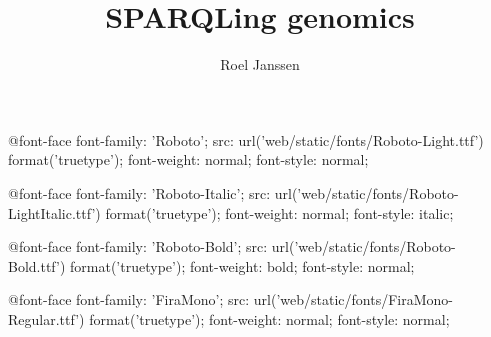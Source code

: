 \documentclass[11pt,a4paper,oneside]{book}
\title{SPARQLing genomics}
\author{Roel Janssen}
\begin{document}
\ifdefined\HCode
{} {\NoFonts\hfill\break} {\EndNoFonts}
\CssFile
@font-face {
    font-family: 'Roboto';
    src: url('web/static/fonts/Roboto-Light.ttf') format('truetype');
    font-weight: normal;
    font-style: normal;
}

@font-face {
    font-family: 'Roboto-Italic';
    src: url('web/static/fonts/Roboto-LightItalic.ttf') format('truetype');
    font-weight: normal;
    font-style: italic;
}

@font-face {
    font-family: 'Roboto-Bold';
    src: url('web/static/fonts/Roboto-Bold.ttf') format('truetype');
    font-weight: bold;
    font-style: normal;
}

@font-face {
    font-family: 'FiraMono';
    src: url('web/static/fonts/FiraMono-Regular.ttf') format('truetype');
    font-weight: normal;
    font-style: normal;
}
\end{document}
